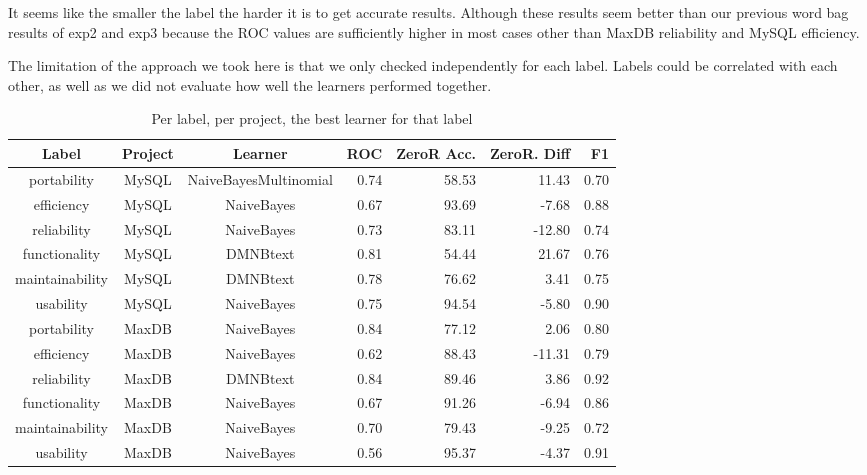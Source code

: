 \documentclass{acm_proc_article-sp}
\begin{document}
It seems like the smaller the label the harder it is to get accurate results. Although these results seem better than our previous word bag results of \textsf{exp2} and \textsf{exp3} because the ROC values are sufficiently higher in most cases other than MaxDB reliability and MySQL efficiency.

The limitation of the approach we took here is that we only checked independently for each label. Labels could be correlated with each other, as well as we did not evaluate how well the learners performed together.


\begin{table}
\centering
\begin{tabular}{ccc|rrrr}
\toprule
Label & Project & Learner & ROC & ZeroR Acc. & ZeroR. Diff & F1\\
\midrule
portability &  MySQL &  NaiveBayesMultinomial &  0.74 &  58.53 &  11.43 &  0.70  \\ 
efficiency &  MySQL &  NaiveBayes &  0.67 &  93.69 &  -7.68 &  0.88 \\ 
reliability &  MySQL &  NaiveBayes &  0.73 &  83.11 &  -12.80 &  0.74 \\ 
functionality &  MySQL &  DMNBtext &  0.81 &  54.44 &  21.67 &  0.76 \\ 
maintainability &  MySQL &  DMNBtext &  0.78 &  76.62 &  3.41 &  0.75 \\ 
usability &  MySQL &  NaiveBayes &  0.75 &  94.54 &  -5.80 &  0.90  \\ 
 \hline 
portability &  MaxDB &  NaiveBayes &  0.84 &  77.12 &  2.06 &  0.80 \\ 
efficiency &  MaxDB &  NaiveBayes &  0.62 &  88.43 &  -11.31 &  0.79 \\ 
reliability &  MaxDB &  DMNBtext &  0.84 &  89.46 &  3.86 &  0.92  \\ 
functionality &  MaxDB &  NaiveBayes &  0.67 &  91.26 &  -6.94 &  0.86  \\ 
maintainability &  MaxDB &  NaiveBayes &  0.70 &  79.43 &  -9.25 &  0.72  \\ 
usability &  MaxDB &  NaiveBayes &  0.56 &  95.37 &  -4.37 &  0.91  \\ 
 \hline 
\end{tabular}
\caption{Per label, per project, the best learner for that label}
\label{tab:best-learner-per-tag}
\end{table}
\end{document}
